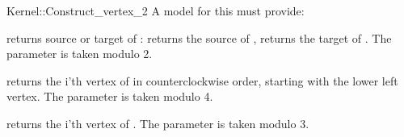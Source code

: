 \begin{ccRefFunctionObjectConcept}{Kernel::Construct_vertex_2}
A model for this must provide:



 {returns source or target of : \ccVar{}
  returns the source of , \ccVar{} returns the target
  of . The parameter  is taken modulo 2. }

 {returns the i'th vertex of
   in counterclockwise order, starting with the lower left
  vertex. The parameter  is taken modulo 4.}

 {returns the i'th vertex of . The parameter
   is taken modulo 3.}


\ccIsModel{}

\end{ccRefFunctionObjectConcept}
